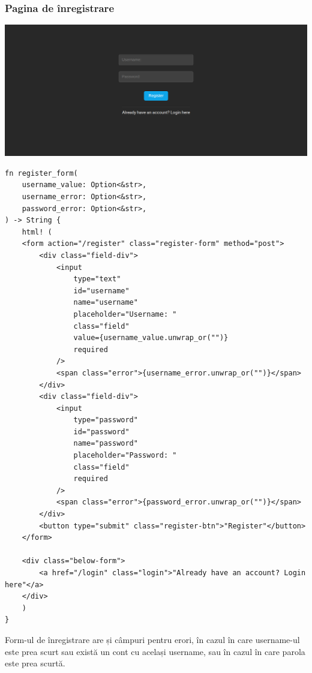 \vspace{3cm}
\subsubsection{Pagina de înregistrare}

\vspace{1cm}
\begin{center}
	\includegraphics[width=15cm]{3/frontend/register.png}
\end{center}
\vspace{1cm}

\begin{lstlisting}[language=RustHtml]
fn register_form(
    username_value: Option<&str>,
    username_error: Option<&str>,
    password_error: Option<&str>,
) -> String {
    html! (
    <form action="/register" class="register-form" method="post">
        <div class="field-div">
            <input
                type="text"
                id="username"
                name="username"
                placeholder="Username: "
                class="field"
                value={username_value.unwrap_or("")}
                required
            />
            <span class="error">{username_error.unwrap_or("")}</span>
        </div>
        <div class="field-div">
            <input
                type="password"
                id="password"
                name="password"
                placeholder="Password: "
                class="field"
                required
            />
            <span class="error">{password_error.unwrap_or("")}</span>
        </div>
        <button type="submit" class="register-btn">"Register"</button>
    </form>

    <div class="below-form">
        <a href="/login" class="login">"Already have an account? Login here"</a>
    </div>
    )
}
\end{lstlisting}

Form-ul de înregistrare are și câmpuri pentru erori, în cazul în care username-ul este
prea scurt sau există un cont cu același username, sau în cazul în care parola este prea
scurtă.
